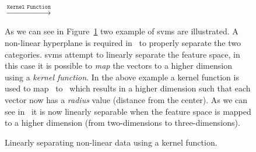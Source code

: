 \begin{figure}[h]
  \centering
  $\xrightarrow{\texttt{Kernel Function}}$
  \caption{Linearly separating non-linear data using a kernel function.}
  \vspace{1mm}
  \footnotesize{As we can see in Figure~\ref{fig:SVM_non-linear_kernel} two example of \gls{svm}s are illustrated. A non-linear hyperplane is required in~ to properly separate the two categories. \gls{svm}s attempt to linearly separate the feature space, in this case it is possible to \emph{map} the vectors to a higher dimension using a \emph{kernel function}. In the above example a kernel function is used to map~ to~ which results in a higher dimension such that each vector now has a \emph{radius} value (distance from the center). As we can see in~ it is now linearly separable when the feature space is mapped to a higher dimension (from two-dimensions to three-dimensions).}
  \vspace{1mm}
  \label{fig:SVM_non-linear_kernel}
\end{figure}


